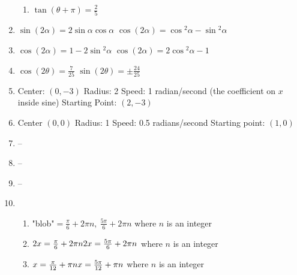 \documentclass{article}
\begin{document}
\begin{enumerate}
\begin{enumerate}
	\item $\tan{(\theta + \pi)} = \frac{2}{5}$
	
	\end{enumerate}
	
\item $\sin{(2\alpha)} = 2 \sin{\alpha} \cos{\alpha}$ \newline
	$\cos{(2\alpha)} = \cos{^2\alpha} - \sin{^2\alpha}$

\item $\cos{(2 \alpha)} = 1 - 2 \sin{^2 \alpha}$ \newline
	$\cos{(2 \alpha)} = 2 \cos{^2 \alpha} - 1$

\item $\cos{(2 \theta)} = \frac{7}{25}$ \newline
	$\sin{(2 \theta)} = \pm \frac{24}{25}$

\item Center: $(0, -3)$ \newline
	Radius: 2 \newline
	Speed: 1 radian/second (the coefficient on $x$ inside sine) \newline
	Starting Point: $(2, -3)$
	
\item Center $(0, 0)$ \newline
	Radius: 1 \newline
	Speed: 0.5 radians/second \newline
	Starting point: $(1, 0)$

\item -- 

\item --

\item --

\item
	
	\begin{enumerate}
	
	\item "blob"$ = \frac{\pi}{6} + 2\pi n, \ \frac{5\pi}{6} + 2\pi n$ where $n$ is an integer
	
	\item $2x = \frac{\pi}{6} + 2\pi n \\
		2x = \frac{5\pi}{6} + 2\pi n$ where $n$ is an integer
		
	\item $x = \frac{\pi}{12} + \pi n \\
		x = \frac{5\pi}{12} + \pi n$ where $n$ is an integer
	

\end{enumerate}
\end{enumerate}
\end{document}
